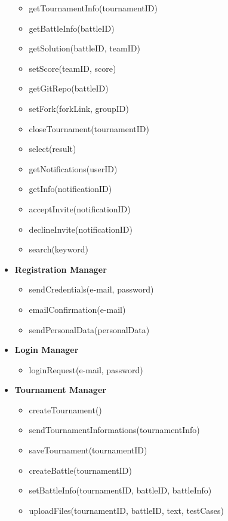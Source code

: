 \documentclass{article}
\begin{document}
\begin{itemize}
\begin{itemize}
            \item getTournamentInfo(tournamentID)
            \item getBattleInfo(battleID)
            \item getSolution(battleID, teamID)
            \item setScore(teamID, score)
            \item getGitRepo(battleID)
            \item setFork(forkLink, groupID)
            \item closeTournament(tournamentID)
            \item select(result)
            \item getNotifications(userID)
            \item getInfo(notificationID)
            \item acceptInvite(notificationID)
            \item declineInvite(notificationID)
            \item search(keyword)
        \end{itemize}
    \item\textbf{Registration Manager}
        \begin{itemize}
            \item sendCredentials(e-mail, password)
            \item emailConfirmation(e-mail)
            \item sendPersonalData(personalData)
        \end{itemize}
     \item\textbf{Login Manager}
        \begin{itemize}
            \item loginRequest(e-mail, password)
        \end{itemize}
    \item \textbf{Tournament Manager}
        \begin{itemize}
            \item createTournament()
            \item sendTournamentInformations(tournamentInfo)
            \item saveTournament(tournamentID)
            \item createBattle(tournamentID)
            \item setBattleInfo(tournamentID, battleID, battleInfo)
            \item uploadFiles(tournamentID, battleID, text, testCases)

\end{itemize}
\end{itemize}
\end{document}
